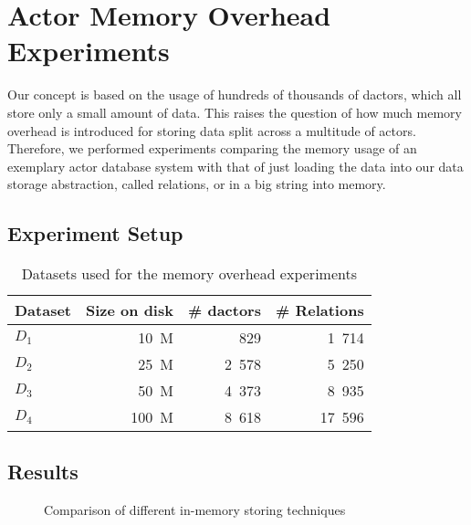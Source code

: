 
\section{Actor Memory Overhead Experiments}\label{sec:experiments}

  Our concept is based on the usage of hundreds of thousands of \glspl{dactor}, which all store only a small amount of data.
  This raises the question of how much memory overhead is introduced for storing data split across a multitude of actors.
  Therefore, we performed experiments comparing the memory usage of an exemplary actor database system with that of just loading the data into our data storage abstraction, called relations, or in a big string into memory.

\subsection{Experiment Setup}

  \begin{table}
    \centering
    \begin{tabular}{lrrr}
      \toprule
      \textbf{Dataset} & \textbf{Size on disk} & \textbf{\# \glspl{dactor}} & \textbf{\# Relations}\\
      \midrule
      $D_1$ & 10~M & 829 & 1~714 \\
      $D_2$ & 25~M & 2~578 & 5~250 \\
      $D_3$ & 50~M & 4~373 & 8~935 \\
      $D_4$ & 100~M & 8~618 & 17~596 \\
      \bottomrule
    \end{tabular}
    \caption{Datasets used for the memory overhead experiments}
    \label{tab:datasets}
  \end{table}

\subsection{Results}

  \begin{figure}
    \centering
    \caption{Comparison of different in-memory storing techniques}
    \label{fig:exp:general}
  \end{figure}

